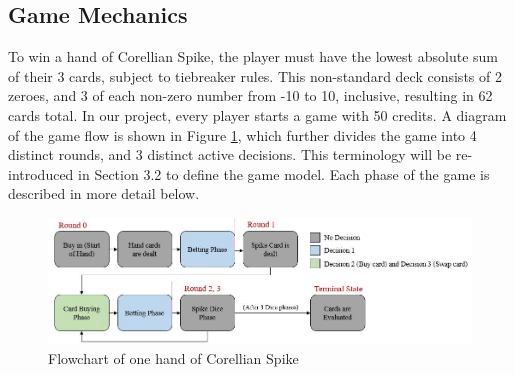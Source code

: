 \documentclass{article}
\begin{document}
\subsection{Game Mechanics} %
To win a hand of Corellian Spike, the player must have the lowest absolute sum of their 3 cards, subject to tiebreaker rules. This non-standard deck consists of 2 zeroes, and 3 of each non-zero number from -10 to 10, inclusive, resulting in 62 cards total. In our project, every player starts a game with 50 credits. A diagram of the game flow is shown in Figure \ref{fig:flowchart}, which further divides the game into 4 distinct rounds, and 3 distinct active decisions. This terminology will be re-introduced in Section 3.2 to define the game model. Each phase of the game is described in more detail below.
\begin{figure}[ht!]
    \centering
    \includegraphics[width=.9\textwidth]{figures/flowchart.jpg}
    \caption{Flowchart of one hand of Corellian Spike}
    \label{fig:flowchart}
\end{figure}
\end{document}
